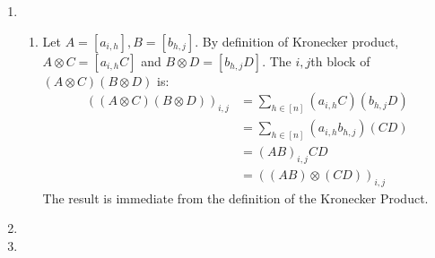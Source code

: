 \documentclass[11pt,a4paper]{article}
\begin{document}
\begin{enumerate}
    \item \begin{enumerate}
              \item Let $A = [a_{i, h}], B = [b_{h, j}]$. By definition of Kronecker product, $A \otimes C = [a_{i, h}C]$ and
                    $B \otimes D = [b_{h, j}D]$. The $i, j$th block of $(A \otimes C)(B \otimes D)$ is:
                    \begin{align*}
                        ((A \otimes C)(B \otimes D))_{i, j} & = \sum_{h \in [n]}(a_{i, h}C)(b_{h, j}D) \\
                        & = \sum_{h \in [n]}(a_{i, h}b_{h, j})(CD) \\
                        & = (AB)_{i, j} CD \\
                        & = ((AB) \otimes (CD))_{i, j}
                    \end{align*}
                    The result is immediate from the definition of the Kronecker Product.

          \end{enumerate}

          \newpage

    \item

          \newpage

    \item

          \newpage
\end{enumerate}
\end{document}

